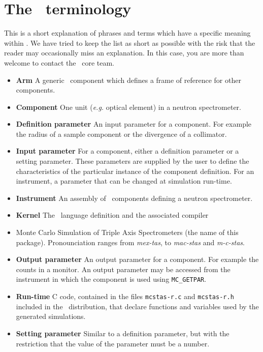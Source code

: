 
\chapter{The \MCS\ terminology}
\label{s:terminology}

This is a short explanation of phrases and terms which have a specific
meaning within \MCS. We have tried to keep the list as short
as possible with the risk that the reader may occasionally miss
an explanation. In this case, you are more than welcome to contact
the \MCS\ core team.

\noindent
\begin{itemize}
\item{\bf Arm}  A generic \MCS\ component which defines a frame of reference
      for other components.
\item{\bf Component} One unit ({\em e.g.} optical element) in a neutron
      spectrometer.
\item{\bf Definition parameter} An input parameter for a component. For
  example the radius of a sample component or the divergence of a collimator.
\item{\bf Input parameter} For a component, either a definition parameter
or a setting parameter. These parameters are supplied by the user to
define the characteristics of the particular instance of the component
definition. For an instrument, a parameter that can be changed at
simulation run-time.
\item{\bf Instrument} An assembly of \MCS\ components defining
      a neutron spectrometer.
\item{\bf Kernel} The \MCS\ language definition and the associated compiler
\item{\bf \MCS} Monte Carlo Simulation of Triple Axis Spectrometers
       (the name of this package). Pronounciation ranges from \emph{mex-tas}, to \emph{mac-stas} and \emph{m-c-stas}.
\item{\bf Output parameter} An output parameter for a component.
  For example the counts in a monitor. An output parameter may be
  accessed from the instrument in which the component is used using
  \verb`MC_GETPAR`.
\item{\bf Run-time} C code, contained in the files
  \verb+mcstas-r.c+ and \verb+mcstas-r.h+ included in the \MCS\
  distribution, that declare functions and variables used by the
  generated simulations.
\item{\bf Setting parameter} Similar to a definition parameter, but with the
  restriction that the value of the parameter must be a number.
\end{itemize}
